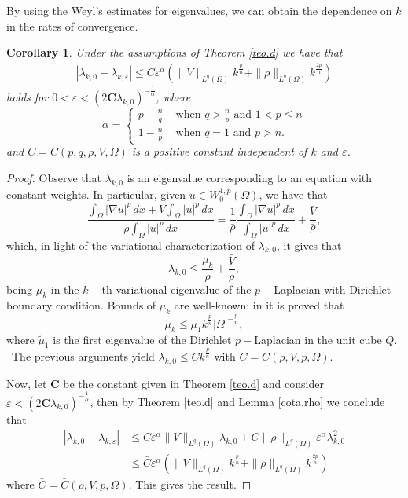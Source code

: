 \documentclass[12pt]{amsart}
\newtheorem{cor}[thm]{Corollary}
\theoremstyle{definition}
\theoremstyle{remark}
\numberwithin{equation}{section}
\begin{document}
By using the Weyl's estimates for eigenvalues, we can obtain the dependence on $k$ in the rates of convergence.

\begin{cor} \label{cor.d}
Under the assumptions of Theorem \ref{teo.d}   we have that
\begin{align*}
|\lambda_{k,0}-\lambda_{k,\varepsilon}| \leq C \varepsilon^\alpha \left( \|V \|_{L^q(\Omega)} k^\frac{p}{n} +     \|\rho \|_{L^q(\Omega)}   k^\frac{2p}{n} \right)
\end{align*}
holds for $0<\varepsilon<(2\textbf{C} \lambda_{k,0})^{-\frac{1}{\alpha}}$, where
$$
\alpha=
\begin{cases}
p-\frac{n}{q} & \text{ when } q> \frac{n}{p} \text{ and } 1<p\leq n\\
1-\frac{n}{p} & \text{ when } q= 1 \text{ and } p>n.
\end{cases}
$$
and $C = C (p,q, \rho,V,\Omega)$  is a positive constant independent of $k$ and $\varepsilon$.
\end{cor}
\begin{proof}




Observe that $\lambda_{k,0}$ is an eigenvalue corresponding to an equation with constant weights. In particular, given $u\in W^{1,p}_0(\Omega)$, we have that
$$
\frac{\int_\Omega |\nabla u|^p\,dx + \bar V \int_\Omega |u|^p\,dx}{\bar \rho \int_\Omega |u|^p\,dx} = \frac{1}{\bar\rho}\frac{\int_\Omega |\nabla u|^p\,dx}{\int_\Omega |u|^p\,dx} + \frac{\bar V}{\bar \rho},
$$
which, in light of the variational characterization of $\lambda_{k,0}$, it gives that
$$
\lambda_{k,0}\leq \frac{\mu_k}{\bar \rho}  + \frac{\bar V}{\bar \rho}, 
$$
being $\mu_k$ in the $k-$th variational eigenvalue of the  $p-$Laplacian  with Dirichlet boundary condition. Bounds of $\mu_k$ are well-known: in \cite{Fried} it is proved that
$$
\mu_k \leq \tilde \mu_1 k^\frac{p}{n} |\Omega|^{-\frac{p}{n}},
$$
where $\tilde \mu_1$ is the first eigenvalue of the Dirichlet $p-$Laplacian in the unit cube $Q$.  
\
The previous arguments yield $\lambda_{k,0} \leq C k^\frac{p}{n}$ with $C=C(\rho,V,p, \Omega)$.


Now, let $\textbf{C}$ be the constant given in Theorem \ref{teo.d} and consider $\varepsilon<(2\textbf{C} \lambda_{k,0})
^{-\frac{1}{\alpha}}$, then by Theorem \ref{teo.d} and Lemma \ref{cota.rho} we conclude that
\begin{align*}
|\lambda_{k,0}-\lambda_{k,\varepsilon}| &\leq  
  C \varepsilon^\alpha \|V  \|_{L^q(\Omega)} \lambda_{k,0} +    C  \|\rho\|_{L^q(\Omega)}  \varepsilon^\alpha \lambda_{k,0}^2\\
&\leq 
\bar C \varepsilon^\alpha \left( \|V\|_{L^q(\Omega)} k^\frac{p}{n} +   \|\rho\|_{L^q(\Omega)}  k^\frac{2p}{n} \right)
\end{align*}
where $\bar C = \bar C (\rho,V,p, \Omega)$. This gives the result.
\end{proof}
\end{document}
